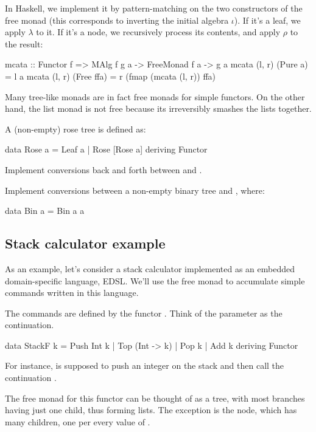 \documentclass[DaoFP]{subfiles}
\begin{document}
In Haskell, we implement it by pattern-matching on the two constructors of the free monad (this corresponds to inverting the initial algebra $\iota$). If it's a leaf, we apply $\lambda$ to it. If it's a node, we recursively process its contents, and apply $\rho$ to the result:
\begin{haskell}
mcata :: Functor f => MAlg f g a -> FreeMonad f a -> g a
mcata (l, r) (Pure a) = l a
mcata (l, r) (Free ffa) = 
  r (fmap (mcata (l, r)) ffa)
\end{haskell}

Many tree-like monads are in fact free monads for simple functors. On the other hand, the list monad is not free because its  irreversibly smashes the lists together.

\begin{exercise}
A (non-empty) rose tree is defined as:
\begin{haskell}
data Rose a = Leaf a | Rose [Rose a]
  deriving Functor
\end{haskell}
Implement conversions back and forth between  and  .
\end{exercise}

\begin{exercise}
Implement conversions between a non-empty binary tree and , where:
\begin{haskell}
data Bin a = Bin a a
\end{haskell}
\end{exercise}

\subsection{Stack calculator example}
As an example, let's consider a stack calculator implemented as an embedded domain-specific language, EDSL. We'll use the free monad to accumulate simple commands written in this language. 

The commands are defined by the functor . Think of the parameter   as the continuation. 
\begin{haskell}
data StackF k  = Push Int k
               | Top (Int -> k)
               | Pop k            
               | Add k
               deriving Functor
\end{haskell}
For instance,  is supposed to push an integer on the stack and then call the continuation .

The free monad for this functor can be thought of as a tree, with most branches having just one child, thus forming lists. The exception is the  node, which has many children, one per every value of .
\end{document}
